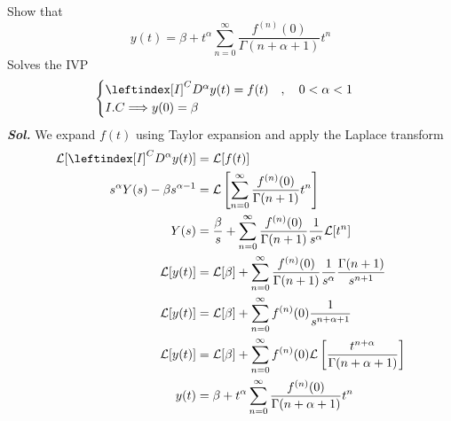 \begin{example}
    Show that 
    \[
        y(t) = \beta + t^{\alpha} \sum_{n=0}^{\infty} \frac{f^{(n)}(0)}{\Gamma(n+\alpha+1)}t^n
    \]
    Solves the IVP 
    \[
        \begin{cases}
            \leftindex[I]^C {D^{\alpha}} y(t) = f(t)    \quad,\quad 0<\alpha<1
            \\
            I.C \Longrightarrow y(0) = \beta
        \end{cases}
    \]
    \textit{ \textbf{Sol.} } We expand $f(t)$ using Taylor expansion and apply the Laplace transform
        \begin{align*}
            \mathcal{L}[\leftindex[I]^C {D^{\alpha}} y(t)] &= \mathcal{L}[f(t)]
            \\
            s^{\alpha} Y(s) - \beta s^{\alpha-1} &= \mathcal{L}\left[\sum_{n=0}^{\infty} \frac{f^{(n)}(0)}{\Gamma(n+1)}t^n\right]
            \\
            Y(s) &= \frac{\beta}{s} + \sum_{n=0}^{\infty} \frac{f^{(n)}(0)}{\Gamma(n+1)}\frac{1}{s^{\alpha}}\mathcal{L}[t^n]
            \\
            \mathcal{L}[y(t)] &= \mathcal{L}[\beta] + \sum_{n=0}^{\infty} \frac{f^{(n)}(0)}{\Gamma(n+1)}\frac{1}{s^{\alpha}}\frac{\Gamma(n+1)}{s^{n+1}}
            \\
            \mathcal{L}[y(t)] &= \mathcal{L}[\beta] + \sum_{n=0}^{\infty} f^{(n)}(0) \frac{1}{s^{n+\alpha+1}}
            \\
            \mathcal{L}[y(t)] &= \mathcal{L}[\beta] + \sum_{n=0}^{\infty} f^{(n)}(0) \mathcal{L}\left[\frac{t^{n+\alpha}}{\Gamma(n+\alpha+1)}\right]
            \\
            y(t) &= \beta + t^{\alpha} \sum_{n=0}^{\infty} \frac{f^{(n)}(0)}{\Gamma(n+\alpha+1)}t^n
        \end{align*}
\end{example}
